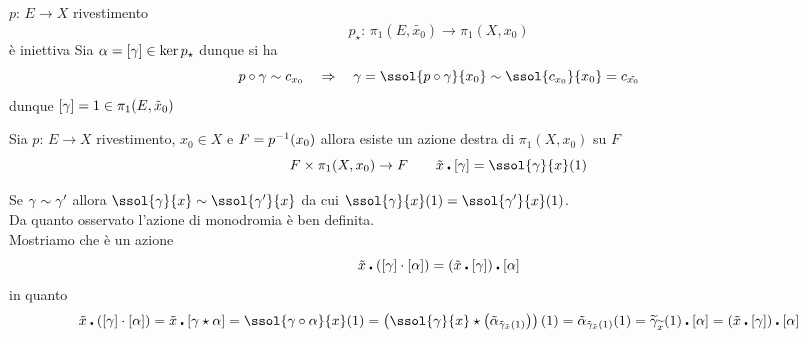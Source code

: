 \spazio
\begin{cor}$p:\, E \to X $ rivestimento
$$ p_\star:\, \pi_1(E, \tilde{x_0}) \to \pi_1(X,x_0)$$
\`e iniettiva 
\proof Sia $\alpha=[\gamma]\in \ker p_\star$ dunque si ha 
$$ p \circ \gamma \sim c_{x_0} \quad \implica \quad \amma=\ssol{p\circ \amma}{x_0} 
\sim \ssol{c_{x_0}}{x_0} 
= c_{\tilde{x_0}}$$
dunque $[\gamma]=1 \in \pi_1(E, \tilde{x}_0)$
\end{cor}
\spazio
\begin{defn}[Monodromia]\bianco
Sia $p:\, E \to X$ rivestimento, $x_0\in X$ e $F=p^{-1}(x_0)$ allora esiste un azione destra di $\pi_1(X,x_0) $ su $F$ 
$$ F \times \pi_1(X,x_0) \to F \qquad \tilde{x}\az[\amma] = \ssol{\amma}{x}(1)$$
\end{defn}
\begin{oss}Se $\gamma\sim\gamma'$ allora $\ssol{\amma}{x} \sim \ssol{\amma'}{x}$ da cui $\ssol{\amma}{x}(1)= \ssol{\amma'}{x}(1)$.\\
Da quanto osservato l'azione di monodromia \`e ben definita.\\
Mostriamo che \`e un azione 
$$ \tilde{x}\centerdot \left( [\gamma]\cdot [\alpha] \right) =\left( \tilde{x}\centerdot [\gamma] \right)\centerdot [\alpha]$$ in quanto
$$ \tilde{x}\az \left( [\amma]\cdot [\alpha] \right)
= \tilde{x}\az
 [ \gamma\star \alpha] 
 = \ssol{\amma\circ \alpha}{x}(1)
 =\left( \ssol{\amma}{x} \star \left( \tilde{\alpha}_{\tilde{\amma}_{\tilde{x}}(1)} \right) \right)(1) = \tilde{\alpha}_{\tilde{\amma}_{\tilde{x}}(1)}(1)=\sol{\amma}{x}(1) \az [\alpha]=\left( \tilde{x} \az [\amma] \right)\az [\alpha]
  $$\end{oss}
